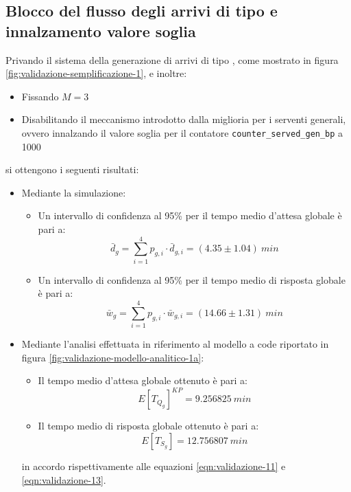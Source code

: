 \newpage
\subsection{Blocco del flusso degli arrivi di tipo \sr{} e innalzamento valore soglia}
Privando il sistema della generazione di arrivi di tipo \sr{}, come mostrato in figura \ref{fig:validazione-semplificazione-1}, e inoltre:
\begin{itemize}
\item Fissando $M = 3$
\item Disabilitando il meccanismo introdotto dalla miglioria per i serventi generali, ovvero innalzando il valore soglia per il contatore \texttt{counter\_served\_gen\_bp} a 1000
\end{itemize}
si ottengono i seguenti risultati:
\begin{itemize}
\item Mediante la simulazione:
\begin{itemize}
\item Un intervallo di confidenza al 95\% per il tempo medio d'attesa globale è pari a:
\begin{equation} 
\bar{d}_g = \sum_{i = 1}^4 p_{g,i}\cdot \bar{d}_{g,i} = (4.35 \pm 1.04)\ min
\end{equation}
\item Un intervallo di confidenza al 95\% per il tempo medio di risposta globale è pari a:
\begin{equation}
\bar{w}_g = \sum_{i = 1}^4 p_{g,i}\cdot \bar{w}_{g,i} = (14.66 \pm 1.31)\ min
\end{equation}
\end{itemize}

\item Mediante l'analisi effettuata in riferimento al modello a code riportato in figura \ref{fig:validazione-modello-analitico-1a}:
\begin{itemize}
\item Il tempo medio d'attesa globale ottenuto è pari a:
\begin{equation}
E[T_{Q_g}]^{KP} = 9.256825\ min 
\end{equation}
\item Il tempo medio di risposta globale ottenuto è pari a:
\begin{equation}
E[T_{S_g}] = 12.756807\ min 
\end{equation}
\end{itemize}
in accordo rispettivamente alle equazioni \ref{eqn:validazione-11} e \ref{eqn:validazione-13}.
\end{itemize}


